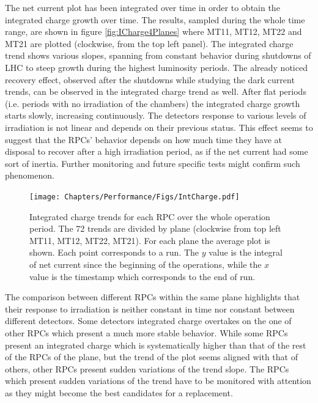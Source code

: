 The net current plot has been integrated over time in order to obtain the integrated charge growth over time.
The results, sampled during the whole time range, are shown in figure \ref{fig:ICharge4Planes} where MT11, MT12, MT22 and MT21 are plotted (clockwise, from the top left panel).
The integrated charge trend shows various slopes, spanning from constant behavior during shutdowns of LHC to steep growth during the highest luminosity periods.
The already noticed recovery effect, observed after the shutdowns while studying the dark current trends, can be observed in the integrated charge trend as well.
After flat periods (i.e. periods with no irradiation of the chambers) the integrated charge growth starts slowly, increasing continuously.
The detectors response to various levels of irradiation is not linear and depends on their previous status.
This effect seems to suggest that the RPCs' behavior depends on how much time they have at disposal to recover after a high irradiation period, as if the net current had some sort of inertia.
Further monitoring and future specific tests might confirm such phenomenon.

\begin{figure}[!t]
\begin{center}
\texttt{[image: Chapters/Performance/Figs/IntCharge.pdf]}
\caption{Integrated charge trends for each RPC over the whole operation period. The 72 trends are divided by plane (clockwise from top left MT11, MT12, MT22, MT21). For each plane the average plot is shown. Each point corresponds to a run. The $y$ value is the integral of net current since the beginning of the operations, while the $x$ value is the timestamp which corresponds to the end of run.}
\label{fig:ICharge4anes}
\end{center}
\end{figure}

The comparison between different RPCs within the same plane highlights that their response to irradiation is neither constant in time nor constant between different detectors.
Some detectors integrated charge overtakes on the one of other RPCs which present a much more stable behavior.
While some RPCs present an integrated charge which is systematically higher than that of the rest of the RPCs of the plane, but the trend of the plot seems aligned with that of others, other RPCs present sudden variations of the trend slope.
The RPCs which present sudden variations of the trend have to be monitored with attention as they might become the best candidates for a replacement.


